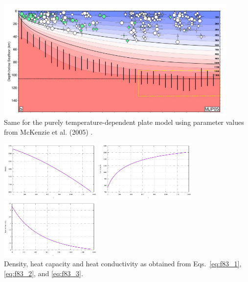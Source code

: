 \begin{center}
\includegraphics[width=12cm]{python_codes/fieldstone_83/images/rihc18b}\\
{\captionfont Same for the purely temperature-dependent plate model using parameter values from
McKenzie et al. (2005) \cite{mcjp05}.}
\end{center}

\begin{center}
\includegraphics[width=5cm]{python_codes/fieldstone_83/results_model2/rho.pdf}
\includegraphics[width=5cm]{python_codes/fieldstone_83/results_model2/hcapa.pdf}
\includegraphics[width=5cm]{python_codes/fieldstone_83/results_model2/hcond.pdf}\\
{\captionfont Density, heat capacity and heat conductivity as obtained from Eqs.~\eqref{eq:f83_1}, \eqref{eq:f83_2}, and \eqref{eq:f83_3}.}
\end{center}



